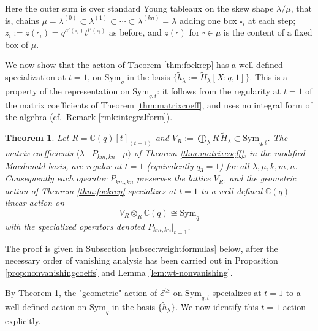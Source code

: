 \documentclass{amsart}
\numberwithin{equation}{section}
\newtheorem{theorem}[lemma]{Theorem}%
\theoremstyle{definition}
\def\bar{\overline}
\def\tilde{\widetilde}
\def\Sym{{\mathrm{Sym}}}
\newcommand{\tH}{\widetilde{H}}
\renewcommand{\th}{\tilde{h}}
\newcommand{\cE}{\mathcal{E}}
\newcommand{\C}{{\mathbb C}}
\newcommand{\Z}{{\mathbb Z}}
\begin{document}
Here the outer sum is over standard Young tableaux on the skew shape $\lambda/\mu$, that is, chains $\mu=\lambda^{(0)}\subset\lambda^{(1)}\subset\cdots\subset\lambda^{(kn)}=\lambda$ adding one box $\square_i$ at each step; $z_i:=z(\square_i)=q^{a'(\square_i)}t^{l'(\square_i)}$ as before, and $z(\square)$ for $\square\in\mu$ is the content of a fixed box of $\mu$.

We now show that the action of Theorem \ref{thm:fockrep} has a well-defined specialization at $t=1$, on $\Sym_q$ in the basis $\{\th_\lambda := \tH_\lambda[X;q,1]\}$. This is a property of the representation on $\Sym_{q,t}$: it follows from the regularity at $t=1$ of the matrix coefficients of Theorem \ref{thm:matrixcoeff}, and uses no integral form of the algebra (cf.\ Remark \ref{rmk:integralform}).

\begin{theorem}\label{thm:t1specialization}
Let $R = \C(q)[t]_{(t-1)}$ and $V_R := \bigoplus_\lambda R\,\tH_\lambda \subset \Sym_{q,t}$. The matrix coefficients $\langle \lambda \mid P_{km,kn} \mid \mu \rangle$ of Theorem \ref{thm:matrixcoeff}, in the modified Macdonald basis, are regular at $t=1$ (equivalently $q_3=1$) for all $\lambda, \mu, k, m, n$. Consequently each operator $P_{km,kn}$ preserves the lattice $V_R$, and the geometric action of Theorem \ref{thm:fockrep} specializes at $t=1$ to a well-defined $\C(q)$-linear action on
$$V_R \otimes_R \C(q) \cong \Sym_q$$
with the specialized operators denoted $P_{km,kn}|_{t=1}$. 
\end{theorem}
The proof is given in Subsection \ref{subsec:weightformulas} below, after the necessary order of vanishing analysis has been carried out in Proposition \ref{prop:nonvanishingcoeffs} and Lemma \ref{lem:wt-nonvanishing}.

By Theorem \ref{thm:t1specialization}, the "geometric" action of $\cE^\geq$ on $\Sym_{q,t}$ specializes at $t=1$ to a well-defined action on $\Sym_q$ in the basis $\{\th_\lambda\}$. We now identify this $t=1$ action explicitly.
\end{document}
